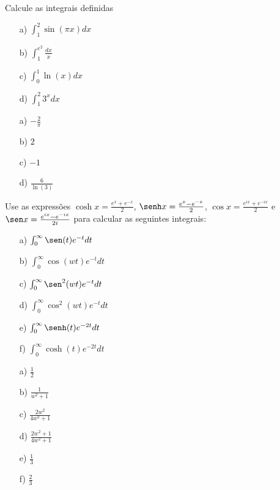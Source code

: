 \begin{exer} Calcule as integrais definidas
\begin{itemize}
  \item[a)] $\int_1^2\sin(\pi x)dx$
  \item[b)] $\int_1^{e^2} \frac{dx}{x}$ 
  \item[c)] $\int_0^{1} \ln(x)dx$
  \item[d)] $\int_1^{2} 3^xdx$
\end{itemize}
\end{exer}
\begin{resp}
\begin{itemize}
  \item[a)] $-\frac{2}{\pi}$
  \item[b)] $2$ 
  \item[c)] $-1$
  \item[d)] $\frac{6}{\ln(3)}$
\end{itemize}
\end{resp}
\begin{exer}
Use as expressões $\cosh x=\frac{e^x+e^{-x}}{2}$, $\senh x=\frac{e^x-e^{-x}}{2}$, $\cos x=\frac{e^{ix}+e^{-ix}}{2}$ e $\sen x=\frac{e^{ix}-e^{-ix}}{2i}$  para calcular as seguintes integrais:
\begin{itemize}
\item[a)] $\int_{0}^{\infty} \sen(t)e^{-t}dt$
\item[b)] $\int_{0}^{\infty} \cos(wt)e^{-t}dt$
\item[c)] $\int_{0}^{\infty} \sen^2(wt)e^{-t}dt$
\item[d)] $\int_{0}^{\infty} \cos^2(wt)e^{-t}dt$
\item[e)] $\int_{0}^{\infty} \senh(t)e^{-2t}dt$
\item[f)] $\int_{0}^{\infty} \cosh(t)e^{-2t}dt$
\end{itemize}
 
\end{exer}
\begin{resp}
\begin{itemize}
\item[a)] $\frac{1}{2}$
\item[b)] $\frac{1}{w^2+1}$
\item[c)] $\frac{2w^2}{4w^2+1}$
\item[d)] $\frac{2w^2+1}{4w^2+1}$
\item[e)] $\frac{1}{3}$
\item[f)] $\frac{2}{3}$
\end{itemize}
 
\end{resp}



